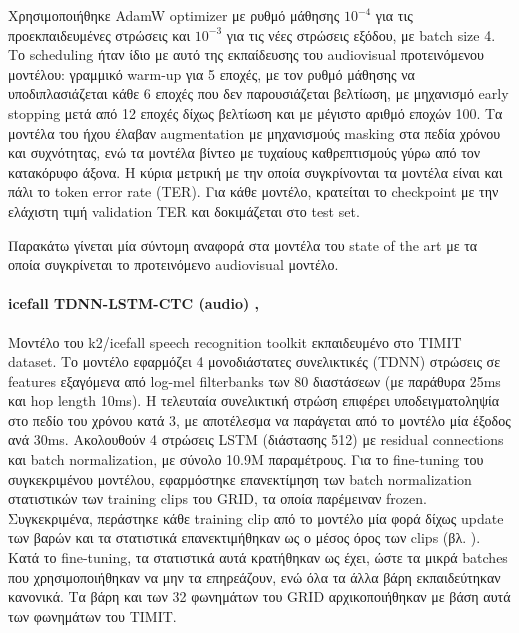 Χρησιμοποιήθηκε AdamW optimizer με ρυθμό μάθησης $10^{-4}$ για τις προεκπαιδευμένες στρώσεις και $10^{-3}$ για τις νέες στρώσεις εξόδου, με batch size 4. Το scheduling ήταν ίδιο με αυτό της εκπαίδευσης του audiovisual προτεινόμενου μοντέλου: γραμμικό warm-up για 5 εποχές, με τον ρυθμό μάθησης να υποδιπλασιάζεται κάθε 6 εποχές που δεν παρουσιάζεται βελτίωση, με μηχανισμό early stopping μετά από 12 εποχές δίχως βελτίωση και με μέγιστο αριθμό εποχών 100. Τα μοντέλα του ήχου έλαβαν augmentation με μηχανισμούς masking στα πεδία χρόνου και συχνότητας, ενώ τα μοντέλα βίντεο με τυχαίους καθρεπτισμούς γύρω από τον κατακόρυφο άξονα. Η κύρια μετρική με την οποία συγκρίνονται τα μοντέλα είναι και πάλι το token error rate (TER). Για κάθε μοντέλο, κρατείται το checkpoint με την ελάχιστη τιμή validation TER και δοκιμάζεται στο test set.

Παρακάτω γίνεται μία σύντομη αναφορά στα μοντέλα του state of the art με τα οποία συγκρίνεται το προτεινόμενο audiovisual μοντέλο.

\paragraph{icefall TDNN-LSTM-CTC (audio) \cite{icefall}, \cite{luo2021icefalltimit}} Μοντέλο του k2/icefall speech recognition toolkit εκπαιδευμένο στο TIMIT \cite{garofolo1993timit} dataset. Το μοντέλο εφαρμόζει 4 μονοδιάστατες συνελικτικές (TDNN) στρώσεις σε features εξαγόμενα από log-mel filterbanks των 80 διαστάσεων (με παράθυρα 25ms και hop length 10ms). Η τελευταία συνελικτική στρώση επιφέρει υποδειγματοληψία στο πεδίο του χρόνου κατά 3, με αποτέλεσμα να παράγεται από το μοντέλο μία έξοδος ανά 30ms. Ακολουθούν 4 στρώσεις LSTM (διάστασης 512) με residual connections και batch normalization, με σύνολο 10.9M παραμέτρους. Για το fine-tuning του συγκεκριμένου μοντέλου, εφαρμόστηκε επανεκτίμηση των batch normalization στατιστικών των training clips του GRID, τα οποία παρέμειναν frozen. Συγκεκριμένα, περάστηκε κάθε training clip από το μοντέλο μία φορά δίχως update των βαρών και τα στατιστικά επανεκτιμήθηκαν ως ο μέσος όρος των clips (βλ. \cite{li2016revisitingbatchnormalizationpractical}). Κατά το fine-tuning, τα στατιστικά αυτά κρατήθηκαν ως έχει, ώστε τα μικρά batches που χρησιμοποιήθηκαν να μην τα επηρεάζουν, ενώ όλα τα άλλα βάρη εκπαιδεύτηκαν κανονικά. Τα βάρη και των 32 φωνημάτων του GRID αρχικοποιήθηκαν με βάση αυτά των φωνημάτων του TIMIT.

